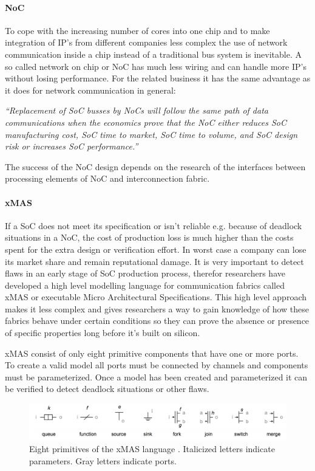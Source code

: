 \paragraph{NoC}

To cope with the increasing number of cores into one chip and to make
integration of IP's from different companies less complex the use of network
communication inside a chip instead of a traditional bus system is inevitable. A
so called network on chip or NoC has much less wiring and can handle more IP's
without losing performance. For the related business it has the same advantage
as it does for network communication in general:

\textit{``Replacement of SoC busses by NoCs will follow the same path of data
communications when the economics prove that the NoC either reduces SoC
manufacturing cost, SoC time to market, SoC time to volume, and SoC design risk
or increases SoC performance.''} \cite{NoC-busses} 

The success of the NoC design depends on the research of the interfaces between
processing elements of NoC and interconnection fabric.

\paragraph{xMAS}

If a SoC does not meet its specification or isn't reliable e.g. because of
deadlock situations in a NoC, the cost of production loss is much higher than
the costs spent for the extra design or verification effort. In worst case a
company can lose its market share and remain reputational damage. It is very
important to detect flaws in an early stage of SoC production process, therefor
researchers have developed a high level modelling language for communication
fabrics called xMAS or executable Micro Architectural Specifications. This high
level approach makes it less complex and gives researchers a way to gain
knowledge of how these fabrics behave under certain conditions so they can prove
the absence or presence of specific properties long before it's built on
silicon.

xMAS consist of only eight primitive components that have one or more ports. To
create a valid model all ports must be connected by channels and components must
be parameterized. Once a model has been created and parameterized it can be
verified to detect deadlock situations or other flaws. 

\begin{figure}[here]
\includegraphics[width=1.0\textwidth]{xmas-language}
\caption{Eight primitives of the xMAS language \cite{6225465}. Italicized letters indicate
parameters. Gray letters indicate ports.}
\label{fig:xmas-language}
\end{figure}

